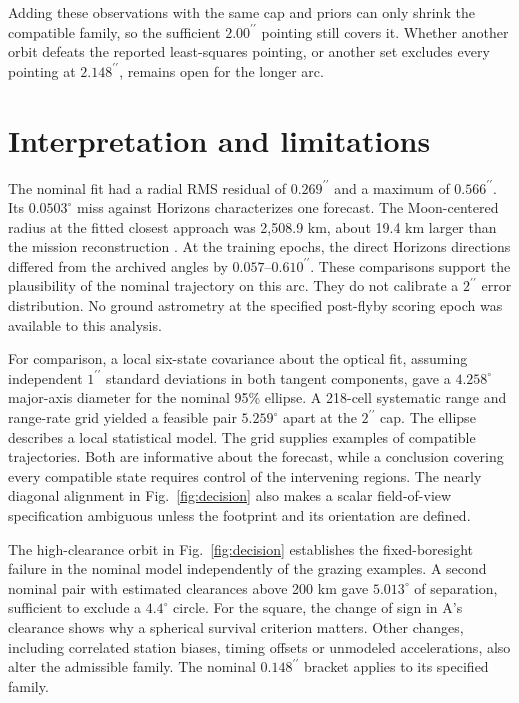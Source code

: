 \documentclass[10pt,letterpaper]{article}
\newcommand{\degc}{^{\circ}}
\newcommand{\as}{^{\prime\prime}}
\begin{document}
Adding these observations with the same cap and priors can only shrink the compatible family, so the sufficient $2.00\as$ pointing still covers it. Whether another orbit defeats the reported least-squares pointing, or another set excludes every pointing at $2.148\as$, remains open for the longer arc.

\section{Interpretation and limitations}

The nominal fit had a radial RMS residual of $0.269\as$ and a maximum of $0.566\as$. Its $0.0503\degc$ miss against Horizons characterizes one forecast. The Moon-centered radius at the fitted closest approach was 2,508.9 km, about 19.4 km larger than the mission reconstruction \cite{dietz}. At the training epochs, the direct Horizons directions differed from the archived angles by $0.057$--$0.610\as$. These comparisons support the plausibility of the nominal trajectory on this arc. They do not calibrate a $2\as$ error distribution. No ground astrometry at the specified post-flyby scoring epoch was available to this analysis.

For comparison, a local six-state covariance about the optical fit, assuming independent $1\as$ standard deviations in both tangent components, gave a $4.258\degc$ major-axis diameter for the nominal 95\% ellipse. A 218-cell systematic range and range-rate grid yielded a feasible pair $5.259\degc$ apart at the $2\as$ cap. The ellipse describes a local statistical model. The grid supplies examples of compatible trajectories. Both are informative about the forecast, while a conclusion covering every compatible state requires control of the intervening regions. The nearly diagonal alignment in Fig.~\ref{fig:decision} also makes a scalar field-of-view specification ambiguous unless the footprint and its orientation are defined.

The high-clearance orbit in Fig.~\ref{fig:decision} establishes the fixed-boresight failure in the nominal model independently of the grazing examples. A second nominal pair with estimated clearances above 200 km gave $5.013\degc$ of separation, sufficient to exclude a $4.4\degc$ circle. For the square, the change of sign in A's clearance shows why a spherical survival criterion matters. Other changes, including correlated station biases, timing offsets or unmodeled accelerations, also alter the admissible family. The nominal $0.148\as$ bracket applies to its specified family.
\end{document}
